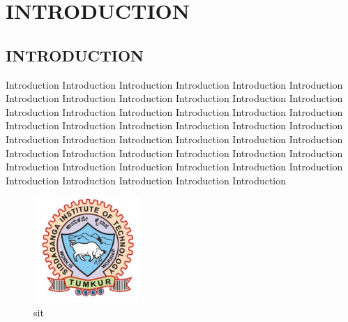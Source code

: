 \chapter{INTRODUCTION}
\label{chap:intro}

\section{INTRODUCTION}
Introduction Introduction Introduction Introduction Introduction Introduction Introduction Introduction Introduction Introduction Introduction Introduction Introduction Introduction Introduction Introduction Introduction Introduction Introduction Introduction Introduction Introduction Introduction Introduction Introduction Introduction Introduction Introduction Introduction Introduction Introduction Introduction Introduction Introduction Introduction Introduction Introduction Introduction Introduction Introduction Introduction Introduction Introduction Introduction Introduction Introduction Introduction\cite{9020094}
\begin{figure}
	\centering
	\includegraphics[width=40mm]{sit.jpg}
	\caption{sit}
\end{figure}



